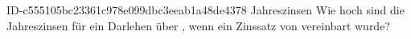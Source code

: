 \begin{exercise}
      {ID-c555105bc23361c978e099dbc3eeab1a48de4378}
      {Jahreszinsen}
  \ifproblem\problem
    Wie hoch sind die Jahreszinsen für ein Darlehen über , wenn
    ein Zinssatz von  vereinbart wurde?
  \fi
\end{exercise}
